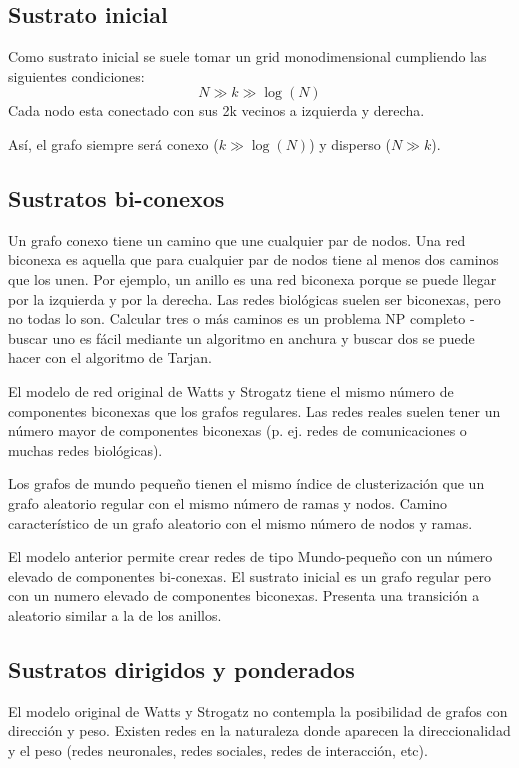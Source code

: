 \subsection{Sustrato inicial}
Como sustrato inicial se suele tomar un grid monodimensional cumpliendo las siguientes condiciones:
$$N \gg k \gg \log(N)$$
Cada nodo esta conectado con sus 2k vecinos a izquierda y derecha.

Así, el grafo siempre será conexo ($k \gg \log(N)$) y disperso ($N \gg k$). 

\subsection{Sustratos bi-conexos}
Un grafo conexo tiene un camino que une cualquier par de nodos. Una red biconexa es aquella que para cualquier par de nodos tiene al menos dos caminos que los unen. Por ejemplo, un anillo es una red biconexa porque se puede llegar por la izquierda y por la derecha. Las redes biológicas suelen ser biconexas, pero no todas lo son. Calcular tres o más caminos es un problema NP completo - buscar uno es fácil mediante un algoritmo en anchura y buscar dos se puede hacer con el algoritmo de Tarjan.

El modelo de red original de Watts y Strogatz tiene el mismo número de componentes biconexas que los grafos regulares. Las redes reales suelen tener un número mayor de componentes biconexas (p. ej. redes de comunicaciones o muchas redes biológicas).

Los grafos de mundo pequeño tienen el mismo índice de clusterización que un grafo aleatorio regular con el mismo número de ramas y nodos. Camino característico de un grafo aleatorio con el mismo número de nodos y ramas.

El modelo anterior permite crear redes de tipo Mundo-pequeño con un número elevado de componentes bi-conexas. El sustrato inicial es un grafo regular pero con un numero elevado de componentes biconexas. Presenta una transición a aleatorio similar a la de los anillos.

\subsection{Sustratos dirigidos y ponderados}
El modelo original de Watts y Strogatz no contempla la posibilidad de grafos con dirección y peso. Existen redes en la naturaleza donde aparecen la direccionalidad y el peso (redes neuronales, redes sociales, redes de interacción, etc).

